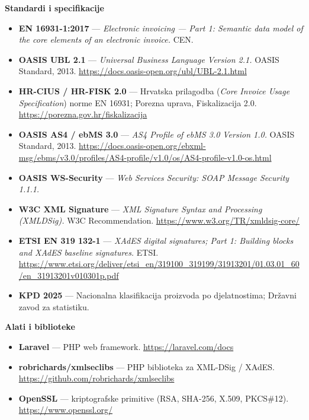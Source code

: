 \documentclass[11pt,a4paper]{article}
\begin{document}
\textbf{Standardi i specifikacije}
\begin{itemize}[nosep]
  \item \textbf{EN 16931-1:2017} — \textit{Electronic invoicing — Part 1: Semantic data model
        of the core elements of an electronic invoice.} CEN.
  \item \textbf{OASIS UBL 2.1} — \textit{Universal Business Language Version 2.1.} OASIS Standard, 2013.
        \url{https://docs.oasis-open.org/ubl/UBL-2.1.html}
  \item \textbf{HR-CIUS / HR-FISK 2.0} — Hrvatska prilagodba (\textit{Core Invoice Usage
        Specification}) norme EN 16931; Porezna uprava, Fiskalizacija 2.0.
        \url{https://porezna.gov.hr/fiskalizacija}
  \item \textbf{OASIS AS4 / ebMS 3.0} — \textit{AS4 Profile of ebMS 3.0 Version 1.0.} OASIS
        Standard, 2013. \url{https://docs.oasis-open.org/ebxml-msg/ebms/v3.0/profiles/AS4-profile/v1.0/os/AS4-profile-v1.0-os.html}
  \item \textbf{OASIS WS-Security} — \textit{Web Services Security: SOAP Message Security 1.1.1.}
  \item \textbf{W3C XML Signature} — \textit{XML Signature Syntax and Processing
        (XMLDSig).} W3C Recommendation. \url{https://www.w3.org/TR/xmldsig-core/}
  \item \textbf{ETSI EN 319 132-1} — \textit{XAdES digital signatures; Part 1: Building blocks
        and XAdES baseline signatures.} ETSI.
        \url{https://www.etsi.org/deliver/etsi_en/319100_319199/31913201/01.03.01_60/en_31913201v010301p.pdf}
  \item \textbf{KPD 2025} — Nacionalna klasifikacija proizvoda po djelatnostima; Državni
        zavod za statistiku.
\end{itemize}

\textbf{Alati i biblioteke}
\begin{itemize}[nosep]
  \item \textbf{Laravel} — PHP web framework. \url{https://laravel.com/docs}
  \item \textbf{robrichards/xmlseclibs} — PHP biblioteka za XML-DSig / XAdES.
        \url{https://github.com/robrichards/xmlseclibs}
  \item \textbf{OpenSSL} — kriptografske primitive (RSA, SHA-256, X.509, PKCS\#12).
        \url{https://www.openssl.org/}
\end{itemize}
\end{document}
